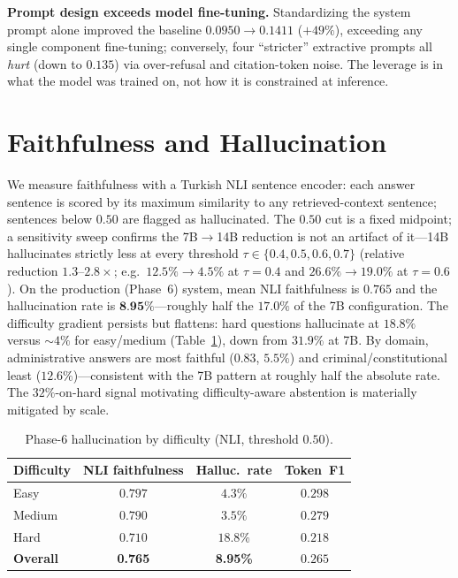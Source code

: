 \documentclass[conference]{IEEEtran}
\newcommand{\best}[1]{\textbf{#1}}
\begin{document}
\textbf{Prompt design exceeds model fine-tuning.} Standardizing the system
prompt alone improved the baseline $0.0950\rightarrow 0.1411$ ($+49\%$),
exceeding any single component fine-tuning; conversely, four ``stricter''
extractive prompts all \emph{hurt} (down to $0.135$) via over-refusal and
citation-token noise. The leverage is in what the model was trained on, not how
it is constrained at inference.

\section{Faithfulness and Hallucination}
\label{sec:faith}
We measure faithfulness with a Turkish NLI sentence encoder: each answer
sentence is scored by its maximum similarity to any retrieved-context sentence;
sentences below $0.50$ are flagged as hallucinated. The $0.50$ cut is a fixed
midpoint; a sensitivity sweep confirms the 7B$\rightarrow$14B reduction is
not an artifact of it---14B hallucinates strictly less at every threshold
$\tau\in\{0.4,0.5,0.6,0.7\}$ (relative reduction $1.3$--$2.8\times$; e.g.\
$12.5\%\rightarrow 4.5\%$ at $\tau{=}0.4$ and $26.6\%\rightarrow 19.0\%$ at
$\tau{=}0.6$). On the production
(Phase~6) system, mean NLI faithfulness is $0.765$ and the hallucination rate
is $\best{8.95\%}$---roughly half the $17.0\%$ of the 7B configuration. The
difficulty gradient persists but flattens: hard questions hallucinate at
$18.8\%$ versus $\sim\!4\%$ for easy/medium (Table~\ref{tab:halluc}), down from
$31.9\%$ at 7B. By domain, administrative answers are most faithful
($0.83$, $5.5\%$) and criminal/constitutional least ($12.6\%$)---consistent with
the 7B pattern at roughly half the absolute rate. The $32\%$-on-hard signal
motivating difficulty-aware abstention is materially mitigated by scale.

\begin{table}[t]
\caption{Phase-6 hallucination by difficulty (NLI, threshold $0.50$).}
\label{tab:halluc}
\centering\footnotesize
\begin{tabular}{@{}lccc@{}}
\toprule
Difficulty & NLI faithfulness & Halluc.\ rate & Token~F1 \\
\midrule
Easy & $0.797$ & $4.3\%$ & $0.298$ \\
Medium & $0.790$ & $3.5\%$ & $0.279$ \\
Hard & $0.710$ & $18.8\%$ & $0.218$ \\
\midrule
\textbf{Overall} & \textbf{0.765} & \textbf{8.95\%} & $0.265$ \\
\bottomrule
\end{tabular}
\end{table}
\end{document}
